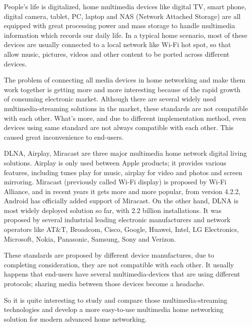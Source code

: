 People's life is digitalized, home multimedia devices like digital TV, smart phone, digital camera, tablet, PC, laptop and NAS (Network Attached Storage) are all equipped with great processing power and mass storage to handle multimedia information which records our daily life. In a typical home scenario, most of these devices are usually connected to a local network like Wi-Fi hot spot, so that allow music, pictures, videos and other content to be ported across different devices. 

The problem of connecting all media devices in home networking and make them work together is getting more and more interesting because of the rapid growth of consuming electronic market. Although there are several widely used multimedia-streaming solutions in the market, these standards are not compatible with each other. What's more, and due to different implementation method, even devices using same standard are not always compatible with each other. This caused great inconvenience to end-users.

DLNA, Airplay, Miracast are three major multimedia home network digital living solutions. Airplay is only used between Apple products; it provides various features, including tunes play for music, airplay for video and photos and screen mirroring. Miracast (previously called Wi-Fi display) is proposed by Wi-Fi Alliance, and in recent years it gets more and more popular, from version 4.2.2, Android has officially added support of Miracast. On the other hand, DLNA is most widely deployed solution so far, with 2.2 billion installations. It was proposed by several industrial leading electronic manufacturers and network operators like AT$\&$T, Broadcom, Cisco, Google, Huawei, Intel, LG Electronics, Microsoft, Nokia, Panasonic, Samsung, Sony and Verizon.

These standards are proposed by different device manufactures, due to completing consideration, they are not compatible with each other. It usually happens that end-users have several multimedia-devices that are using different protocols; sharing media between those devices become a headache.

So it is quite interesting to study and compare those multimedia-streaming technologies and develop a more easy-to-use multimedia home networking solution for modern advanced home networking.

